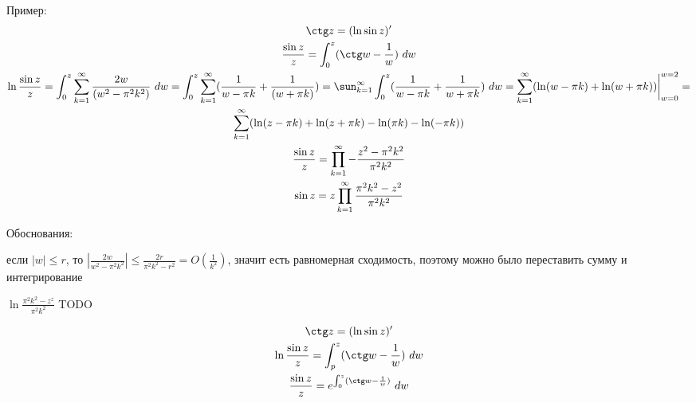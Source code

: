 Пример:
	\begin{gather*}
		\ctg z = (\ln \sin z)' \\
		\frac{\sin z}{z} = \int_0^z (\ctg w - \frac{1}{w}) \ dw \\
		\ln \frac{\sin z}{z} = 
		\int_0^{z} \sum_{k=1}^\infty \frac{2w}{(w^2  - \pi^2 k^2)} \ dw =
		\int_0^{z} \sum_{k=1}^\infty (\frac{1}{w - \pi k} + \frac{1}{(w + \pi k)}) =
		\sun_{k=1}^\infty \int_0^z (\frac{1}{w - \pi k} + \frac{1}{w + \pi k }) \ dw =
		\sum_{k=1}^\infty (\ln(w - \pi k) + \ln(w + \pi k)) \bigg|_{w = 0}^{w = 2} = \\
		\sum_{k=1}^{\infty} (\ln(z - \pi k) + \ln(z + \pi k) - \ln(\pi k) - \ln(-\pi k)) \\
		\frac{\sin z}{z} = \prod_{k=1}^\infty -\frac{z^2 - \pi^2 k^2}{\pi^2 k^2} \\
		\sin z = z\prod_{k=1}^\infty \frac{\pi^2k^2 - z^2}{\pi^2 k^2}
	\end{gather*}

	Обоснования:

	если $|w| \leq r$, то $\left| \frac{2w}{w^2 - \pi^2 k^2} \right| \leq \frac{2r}{\pi^2 k^2 - r^2} = O(\frac{1}{k^2})$,
	значит есть равномерная сходимость, поэтому можно было переставить сумму и интегрирование

	$\ln\frac{\pi^2 k^2 - z^z}{\pi^2 k^2}$ TODO


	\begin{gather*}
		\ctg z = (\ln \sin z)' \\
		\ln \frac{\sin z}{z} = \int_p^z (\ctg w - \frac{1}{w}) \ dw\\
		\frac{\sin z}{z} = e^{\int_0^z (\ctg w - \frac{1}{w})} \ dw
	\end{gather*}

